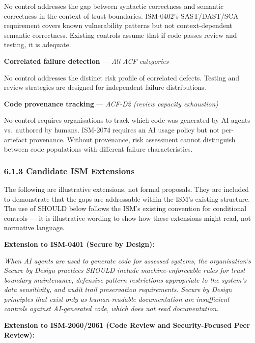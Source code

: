 \documentclass[a4paper,11pt]{report}
\renewenvironment{quote}{%
  \par\medskip\noindent
  \hspace{0.5cm}\begin{minipage}{\dimexpr\textwidth-1cm}
  \itshape\color{dtabody}
}{%
  \end{minipage}\par\medskip
}
\begin{document}
No control addresses the gap between syntactic correctness and semantic
correctness in the context of trust boundaries. ISM-0402's SAST/DAST/SCA
requirement covers known vulnerability patterns but not
context-dependent semantic correctness. Existing controls assume that if
code passes review and testing, it is adequate.

\textbf{Correlated failure detection} --- \emph{All ACF categories}

No control addresses the distinct risk profile of correlated defects.
Testing and review strategies are designed for independent failure
distributions.

\textbf{Code provenance tracking} --- \emph{ACF-D2 (review capacity
exhaustion)}

No control requires organisations to track which code was generated by
AI agents vs.~authored by humans. ISM-2074 requires an AI usage policy
but not per-artefact provenance. Without provenance, risk assessment
cannot distinguish between code populations with different failure
characteristics.

\hypertarget{candidate-ism-extensions}{%
\subsubsection{6.1.3 Candidate ISM
Extensions}\label{candidate-ism-extensions}}

The following are illustrative extensions, not formal proposals. They
are included to demonstrate that the gaps are addressable within the
ISM's existing structure. The use of SHOULD below follows the ISM's
existing convention for conditional controls --- it is illustrative
wording to show how these extensions might read, not normative language.

\textbf{Extension to ISM-0401 (Secure by Design):}

\begin{quote}
\emph{When AI agents are used to generate code for assessed systems, the
organisation's Secure by Design practices SHOULD include
machine-enforceable rules for trust boundary maintenance, defensive
pattern restrictions appropriate to the system's data sensitivity, and
audit trail preservation requirements. Secure by Design principles that
exist only as human-readable documentation are insufficient controls
against AI-generated code, which does not read documentation.}
\end{quote}

\textbf{Extension to ISM-2060/2061 (Code Review and Security-Focused
Peer Review):}
\end{document}
